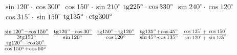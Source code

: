\documentclass[12pt,a4paper]{article}
\begin{document}
	{$\sin 120^\circ\cdot\cos 300^\circ$}
	{$\cos 150^\circ\cdot\sin 210^\circ$}
	{$\text{tg} 225^\circ\cdot\cos 330^\circ$}
	{$\sin 240^\circ\cdot\cos 120^\circ$}
	{$\cos 315^\circ\cdot\sin 150^\circ$}
	{$\text{tg} 135^\circ\cdot\text{ctg} 300^\circ$}
	
	{$\frac{\sin 120^\circ- \cos 150^\circ}{3\text{tg} 150^\circ}$}
	{$\frac{\text{tg} 120^\circ-\cos 30^\circ}{\sin 120^\circ}$}
	{$\frac{\text{tg} 150^\circ-\text{tg} 120^\circ}{\cos 120^\circ}$}
	{$\frac{\text{tg} 135^\circ+\cos 45^\circ}{\sin 45^\circ \cdot \cos135^\circ}$}
	{$\frac{\cos 135^\circ + \cos 150^\circ}{\sin 120^\circ + \sin 135^\circ}$}
	{$\frac{\text{tg} 120^\circ-\cos30^\circ}{\cos 150^\circ+\cos 60^\circ}$}
	
	
\end{document}

